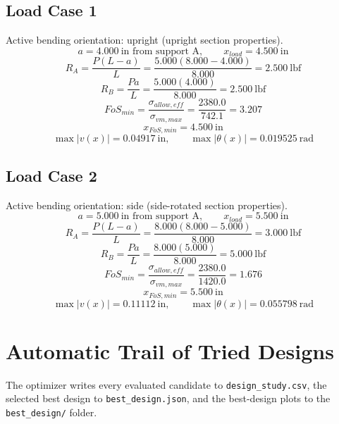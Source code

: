 \documentclass[11pt]{article}
\begin{document}
\subsection*{Load Case 1}
Active bending orientation: upright (upright section properties).
\[a = 4.000\ \mathrm{in} \text{ from support A}, \qquad x_{load} = 4.500\ \mathrm{in}\]
\[R_A = \frac{P(L-a)}{L} = \frac{5.000(8.000-4.000)}{8.000} = 2.500\ \mathrm{lbf}\]
\[R_B = \frac{Pa}{L} = \frac{5.000(4.000)}{8.000} = 2.500\ \mathrm{lbf}\]
\[FoS_{min} = \frac{\sigma_{allow,eff}}{\sigma_{vm,max}} = \frac{2380.0}{742.1} = 3.207\]
\[x_{FoS,min} = 4.500\ \mathrm{in}\]
\[\max |v(x)| = 0.04917\ \mathrm{in}, \qquad \max |\theta(x)| = 0.019525\ \mathrm{rad}\]
\subsection*{Load Case 2}
Active bending orientation: side (side-rotated section properties).
\[a = 5.000\ \mathrm{in} \text{ from support A}, \qquad x_{load} = 5.500\ \mathrm{in}\]
\[R_A = \frac{P(L-a)}{L} = \frac{8.000(8.000-5.000)}{8.000} = 3.000\ \mathrm{lbf}\]
\[R_B = \frac{Pa}{L} = \frac{8.000(5.000)}{8.000} = 5.000\ \mathrm{lbf}\]
\[FoS_{min} = \frac{\sigma_{allow,eff}}{\sigma_{vm,max}} = \frac{2380.0}{1420.0} = 1.676\]
\[x_{FoS,min} = 5.500\ \mathrm{in}\]
\[\max |v(x)| = 0.11112\ \mathrm{in}, \qquad \max |\theta(x)| = 0.055798\ \mathrm{rad}\]

\section*{Automatic Trail of Tried Designs}
The optimizer writes every evaluated candidate to \texttt{design\_study.csv}, the selected best design to \texttt{best\_design.json}, and the best-design plots to the \texttt{best\_design/} folder.
\end{document}
